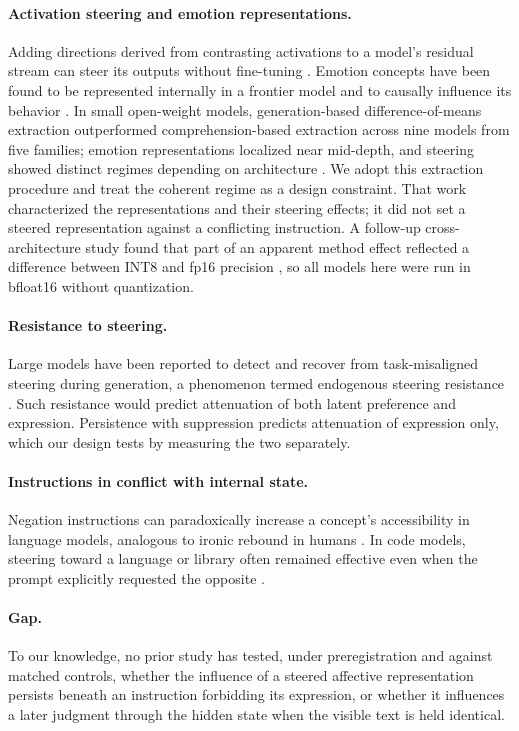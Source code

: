 \documentclass[11pt]{article}
\begin{document}
\paragraph{Activation steering and emotion representations.} Adding directions derived from contrasting activations to a model's residual stream can steer its outputs without fine-tuning \citep{turner2023actadd}. Emotion concepts have been found to be represented internally in a frontier model and to causally influence its behavior \citep{sofroniew2026emotions}. In small open-weight models, generation-based difference-of-means extraction outperformed comprehension-based extraction across nine models from five families; emotion representations localized near mid-depth, and steering showed distinct regimes depending on architecture \citep{jeong2026a}. We adopt this extraction procedure and treat the coherent regime as a design constraint. That work characterized the representations and their steering effects; it did not set a steered representation against a conflicting instruction. A follow-up cross-architecture study found that part of an apparent method effect reflected a difference between INT8 and fp16 precision \citep{jeong2026b}, so all models here were run in bfloat16 without quantization.

\paragraph{Resistance to steering.} Large models have been reported to detect and recover from task-misaligned steering during generation, a phenomenon termed endogenous steering resistance \citep{mckenzie2026esr}. Such resistance would predict attenuation of both latent preference and expression. Persistence with suppression predicts attenuation of expression only, which our design tests by measuring the two separately.

\paragraph{Instructions in conflict with internal state.} Negation instructions can paradoxically increase a concept's accessibility in language models, analogous to ironic rebound in humans \citep{mann2025whitebear}. In code models, steering toward a language or library often remained effective even when the prompt explicitly requested the opposite \citep{rahman2026code}.

\paragraph{Gap.} To our knowledge, no prior study has tested, under preregistration and against matched controls, whether the influence of a steered affective representation persists beneath an instruction forbidding its expression, or whether it influences a later judgment through the hidden state when the visible text is held identical.
\end{document}
